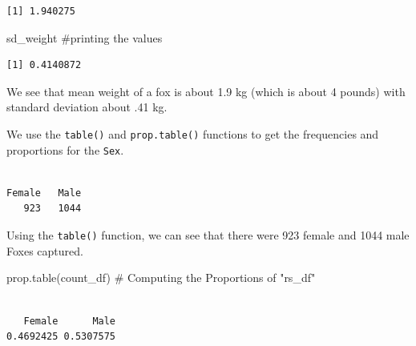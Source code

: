 \documentclass[
  letterpaper,
]{report}
\newenvironment{Shaded}{\begin{snugshade}}{\end{snugshade}}
\newcommand{\CommentTok}[1]{\textcolor[rgb]{0.37,0.37,0.37}{#1}}
\newcommand{\FunctionTok}[1]{\textcolor[rgb]{0.28,0.35,0.67}{#1}}
\newcommand{\NormalTok}[1]{\textcolor[rgb]{0.00,0.23,0.31}{#1}}
\newcommand{\OtherTok}[1]{\textcolor[rgb]{0.00,0.23,0.31}{#1}}
\newcommand{\SpecialCharTok}[1]{\textcolor[rgb]{0.37,0.37,0.37}{#1}}
\begin{document}
\begin{verbatim}
[1] 1.940275
\end{verbatim}

\begin{Shaded}
\begin{Highlighting}[]
\NormalTok{sd\_weight }\CommentTok{\#printing the values}
\end{Highlighting}
\end{Shaded}

\begin{verbatim}
[1] 0.4140872
\end{verbatim}

We see that mean weight of a fox is about 1.9 kg (which is about 4
pounds) with standard deviation about .41 kg.

We use the \texttt{table()} and \texttt{prop.table()} functions to get
the frequencies and proportions for the \texttt{Sex}.

\begin{Shaded}
\end{Shaded}

\begin{verbatim}

Female   Male 
   923   1044 
\end{verbatim}

Using the \texttt{table()} function, we can see that there were 923
female and 1044 male Foxes captured.

\begin{Shaded}
\begin{Highlighting}[]
\FunctionTok{prop.table}\NormalTok{(count\_df) }\CommentTok{\# Computing the Proportions of "rs\_df"}
\end{Highlighting}
\end{Shaded}

\begin{verbatim}

   Female      Male 
0.4692425 0.5307575 
\end{verbatim}
\end{document}
